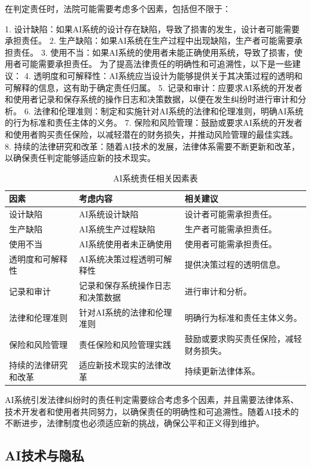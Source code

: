 在判定责任时，法院可能需要考虑多个因素，包括但不限于：

1. 设计缺陷：如果AI系统的设计存在缺陷，导致了损害的发生，设计者可能需要承担责任。
2. 生产缺陷：如果AI系统在生产过程中出现缺陷，生产者可能需要承担责任。
3. 使用不当：如果AI系统的使用者未能正确使用系统，导致了损害，使用者可能需要承担责任。
为了提高法律责任的明确性和可追溯性，以下是一些建议：
4. 透明度和可解释性：AI系统应当设计为能够提供关于其决策过程的透明和可解释的信息，这有助于确定责任归属。
5. 记录和审计：应要求AI系统的开发者和使用者记录和保存系统的操作日志和决策数据，以便在发生纠纷时进行审计和分析。
6. 法律和伦理准则：制定和实施针对AI系统的法律和伦理准则，明确AI系统的行为标准和责任主体的义务。
7. 保险和风险管理：鼓励或要求AI系统的开发者和使用者购买责任保险，以减轻潜在的财务损失，并推动风险管理的最佳实践。
8. 持续的法律研究和改革：随着AI技术的发展，法律体系需要不断更新和改革，以确保责任判定能够适应新的技术现实。


\begin{table}[htbp]
\centering
\begin{tabular}{p{4cm}|p{4cm}|p{4cm}}
\hline
因素 & 考虑内容 & 相关建议 \\
\hline
设计缺陷 & AI系统设计缺陷 & 设计者可能需承担责任。 \\
\hline
生产缺陷 & AI系统生产过程缺陷 &  生产者可能需承担责任。 \\
\hline
使用不当 & AI系统使用者未正确使用 &  使用者可能需承担责任。 \\
\hline
透明度和可解释性 & AI系统决策过程透明可解释性 &  提供决策过程的透明信息。 \\
\hline
记录和审计 & 记录和保存系统操作日志和决策数据 &  进行审计和分析。 \\
\hline
法律和伦理准则 & 针对AI系统的法律和伦理准则 &  明确行为标准和责任主体义务。 \\
\hline
保险和风险管理 & 责任保险和风险管理实践 &鼓励或要求购买责任保险，减轻财务损失。 \\
\hline
持续的法律研究和改革 & 适应新技术现实的法律改革 & 持续更新法律体系。 \\
\hline
\end{tabular}
\caption{AI系统责任相关因素表}
\label{tab:ai_factors}
\end{table}

AI系统引发法律纠纷时的责任判定需要综合考虑多个因素，并且需要法律体系、技术开发者和使用者共同努力，以确保责任的明确性和可追溯性。随着AI技术的不断进步，法律制度也必须适应新的挑战，确保公平和正义得到维护。

\subsection{AI技术与隐私}

